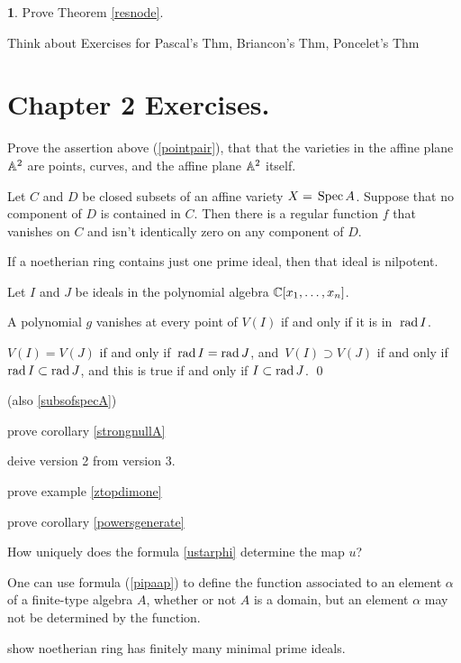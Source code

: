 \documentclass[leqno]{book}
\newcommand\Marginnote[1]{\marginnote{\hspace{-12pt}\normalfont{#1}}}
\theoremstyle{definition}%
\numberwithin{equation}{section}
\newtheorem{thm}[equation]{}
\theoremstyle{theorem} %
\begin{document}
\bs
\msno \begin{thm}
\Marginnote{resnodeex}\label{resnodeex}
Prove Theorem \ref{resnode}.\end{thm}



\bs
Think about Exercises for Pascal's Thm, Briancon's Thm, Poncelet's Thm


\newpage
\section{Chapter 2 Exercises.}\Marginnote{exchaptwo}\label{exchaptwo}

\ms Prove the assertion above (\ref{pointpair}), that that the
varieties in the affine plane $\mathbb{A}^2$ are points, curves, and
the affine plane $\mathbb{A}^2$ itself.

\ms

Let $C$ and $D$ be closed subsets of an affine variety $X=\,\operatorname{Spec} A$.
Suppose that no component of $D$ is contained in $C$.  Then there is a
regular function $f$ that vanishes on $C$ and isn't identically zero
on any component of $D$.

\ms
If a noetherian ring contains just
one prime ideal, then that ideal is nilpotent. 


\ms
Let $I$ and $J$ be ideals in the
polynomial algebra $\mathbb{C}[x_1,\ldots ,x_n]$.

 A polynomial $g$ vanishes at every point of $V(I)$ if
and only if it is in  $\;\operatorname{rad} I$.

 $V(I)= V(J)$ if and only if $\,\operatorname{rad} I = \operatorname{rad} J$, and
$\,V(I) \supset V(J)$ if and only if $\operatorname{rad} I \subset \operatorname{rad} J$, and  this is
true if and only if $I \subset \operatorname{rad} J$.  \qed
\label{zeroonV} 

\ms
(also \ref{subsofspecA})

\ms
prove corollary \ref{strongnullA}

\ms
deive version 2 from version 3.

\ms
prove example \ref{ztopdimone}

\ms
prove corollary \ref{powersgenerate}

\ms
How uniquely does the  formula \ref{ustarphi} determine the map $u$?


\msno 
One can use formula (\ref{pipaap}) to
  define the function associated to an element $\alpha$ of a
  finite-type algebra $A$, whether or not $A$ is a domain, but an
  element $\alpha$ may not be determined by the function.


show noetherian ring has  finitely many minimal prime ideals.
\end{document}
